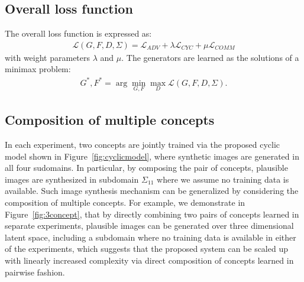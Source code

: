 \documentclass[10pt,twocolumn,letterpaper]{article}
\begin{document}


\subsection{Overall loss function}
\label{sec:overallLoss}
The overall loss function is expressed as:\begin{align}
\mathcal{L}(G,F,D,\Sigma)=\mathcal{L}_{ADV}+\lambda\mathcal{L}_{CYC}+\mu\mathcal{L}_{COMM}
\end{align} with weight parameters $\lambda$ and $\mu$. The generators are learned as the solutions of a minimax problem:\begin{align}
G^*,F^*=\arg\min_{G,F}\max_{D}\mathcal{L}(G,F,D,\Sigma).
\end{align}

\subsection{Composition of multiple concepts}
\label{sec:multiple}
In each experiment, two concepts are jointly trained via the proposed cyclic model shown in Figure~\ref{fig:cyclicmodel}, where synthetic images are generated in all four sudomains. In particular, by composing the pair of concepts, plausible images are synthesized in subdomain $\Sigma_{11}$ where we assume no training data is available. Such image synthesis mechanism can be generalized by considering the composition of multiple concepts. For example, we demonstrate in Figure~\ref{fig:3concept}, that by directly combining two pairs of concepts learned in separate experiments, plausible images can be generated over three dimensional latent space, including a subdomain where no training data is available in either of the experiments, which suggests that the proposed system can be scaled up with linearly increased complexity via direct composition of concepts learned in pairwise fashion.
\end{document}
